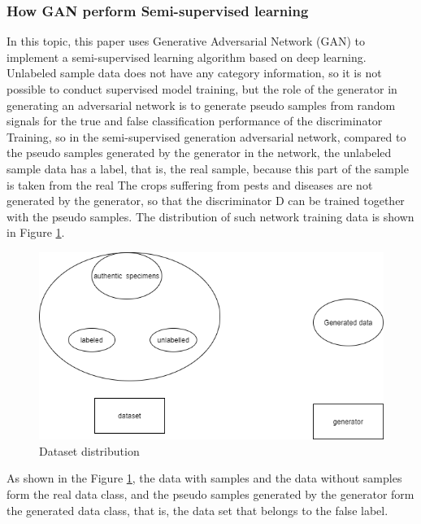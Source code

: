 \documentclass[11pt,en]{elegantpaper}
\begin{document}
\subsubsection{How GAN perform Semi-supervised learning}
In this topic, this paper uses Generative Adversarial Network (GAN) to implement a semi-supervised learning algorithm based on deep learning. Unlabeled sample data does not have any category information, so it is not possible to conduct supervised model training, but the role of the generator in generating an adversarial network is to generate pseudo samples from random signals for the true and false classification performance of the discriminator Training, so in the semi-supervised generation adversarial network, compared to the pseudo samples generated by the generator in the network, the unlabeled sample data has a label, that is, the real sample, because this part of the sample is taken from the real The crops suffering from pests and diseases are not generated by the generator, so that the discriminator D can be trained together with the pseudo samples. The distribution of such network training data is shown in Figure \ref{datadist}.
\begin{figure}[H]
    \centering
	\includegraphics[scale=0.5]{figure/5.1.png} 
	\caption{Dataset distribution}
	\label{datadist}
\end{figure}
As shown in the Figure \ref{datadist}, the data with samples and the data without samples form the real data class, and the pseudo samples generated by the generator form the generated data class, that is, the data set that belongs to the false label.
\end{document}
